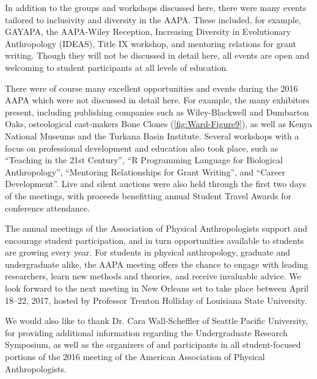 \documentclass[english]{ijsra}
\begin{document}
In addition to the groups and workshops discussed here, there were many events tailored to inclusivity and diversity in the AAPA.
These included, for example, GAYAPA, the AAPA-Wiley Reception, Increasing Diversity in Evolutionary Anthropology (IDEAS),
Title IX workshop, and mentoring relations for grant writing.  
Though they will not be discussed in detail here, all events are open and welcoming to student participants at all levels of education.

There  were of course many excellent opportunities and events during the 2016 AAPA which were not discussed in detail here.
For example, the many exhibitors present, including publishing companies such as Wiley-Blackwell and Dumbarton Oaks,
osteological cast-makers Bone Clones (\cref{fig:Ward-Figure9}), as well as Kenya National Museums and the Turkana Basin Institute. 
Several workshops with a focus on professional development and education also took place, such as “Teaching in the 21st Century”,
“R Programming Language for Biological Anthropology”, “Mentoring Relationships for Grant Writing”, and  “Career Development”.
Live and silent auctions were also held through the first two days of the meetings, 
with proceeds benefitting annual Student Travel Awards for conference attendance.


The annual meetings of the Association of Physical Anthropologists support and encourage student participation,
and in turn opportunities available to students are growing every year. For students in physical anthropology, 
graduate and undergraduate alike, the AAPA meeting offers the chance to engage with leading researchers,
learn new methods and theories, and receive invaluable advice. 
We look forward to the next meeting in New Orleans set to take place between April 18--22, 2017, 
hosted by Professor Trenton Holliday of Louisiana State University.

We  would also like to thank Dr. Cara Wall-Scheffler of Seattle Pacific University,  
for providing additional information regarding the Undergraduate Research Symposium,
as well as the organizers of and participants in all student-focused portions of the 2016 meeting of
the American Association of Physical Anthropologists.
\IJSRAclosing%
\end{document}
